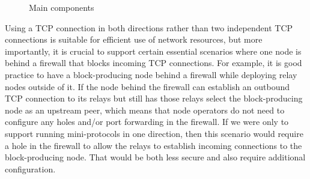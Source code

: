 \begin{figure}[h]
  \caption{Main components}
  \label{tik:components}
\end{figure}

Using a TCP connection in both directions rather than two independent TCP
connections is suitable for efficient use of network resources, but more importantly,
it is crucial to support certain essential scenarios where one node is behind a
firewall that blocks incoming TCP connections. For example, it is good practice
to have a block-producing node behind a firewall while deploying relay nodes
outside of it. If the node behind the firewall can establish an outbound
TCP connection to its relays but still has those relays select the
block-producing node as an upstream peer, which means that node operators do
not need to configure any holes and/or port forwarding in the firewall. If we
were only to support running mini-protocols in one direction, then this scenario
would require a hole in the firewall to allow the relays to establish incoming
connections to the block-producing node. That would be both less secure and also
require additional configuration.

